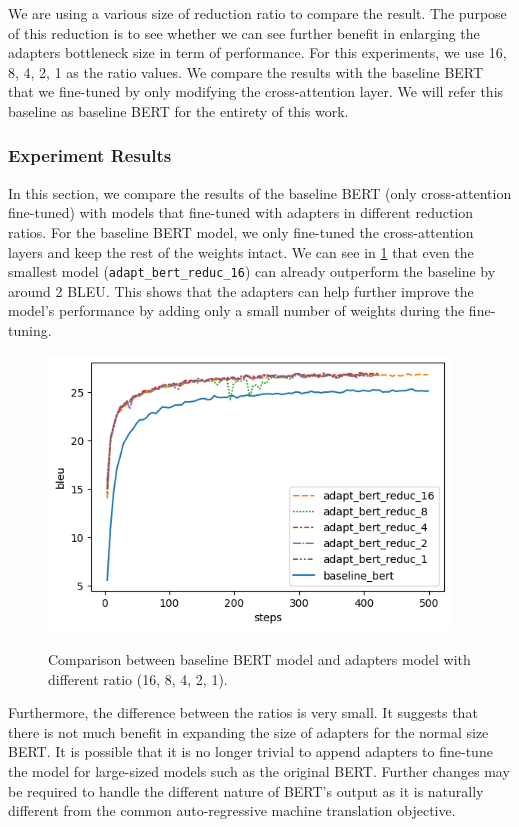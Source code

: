 We are using a various size of reduction ratio to compare the result. The purpose of this reduction is to see whether we can see further benefit in enlarging the adapters bottleneck size in term of performance. For this experiments, we use 16, 8, 4, 2, 1 as the ratio values. We compare the results with the baseline BERT that we fine-tuned by only modifying the cross-attention layer. We will refer this baseline as baseline BERT for the entirety of this work.

\subsubsection{Experiment Results}
In this section, we compare the results of the baseline BERT (only cross-attention fine-tuned) with models that fine-tuned with adapters in different reduction ratios. For the baseline BERT model, we only fine-tuned the cross-attention layers and keep the rest of the weights intact. We can see in \cref{img:adapt_bert_ratio} that even the smallest model (\texttt{adapt\_bert\_reduc\_16}) can already outperform the baseline by around 2 BLEU. This shows that the adapters can help further improve the model's performance by adding only a small number of weights during the fine-tuning.

\begin{figure}[]
    {\includegraphics[width=0.95\textwidth]{img/adapter_bert_baseline_adapters.png}}
    \centering
    \caption{Comparison between baseline BERT model and adapters model with different ratio (16, 8, 4, 2, 1).}
    \label{img:adapt_bert_ratio}
\end{figure}

Furthermore, the difference between the ratios is very small. It suggests that there is not much benefit in expanding the size of adapters for the normal size BERT. It is possible that it is no longer trivial to append adapters to fine-tune the model for large-sized models such as the original BERT. Further changes may be required to handle the different nature of BERT's output as it is naturally different from the common auto-regressive machine translation objective.

